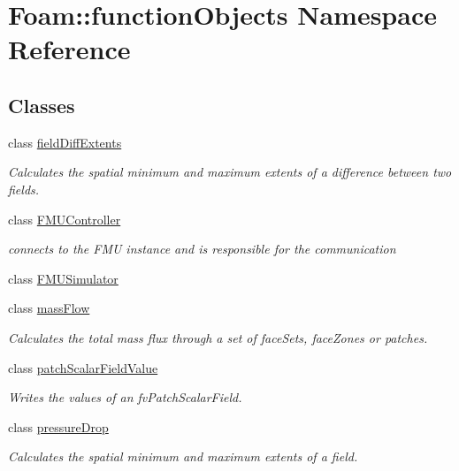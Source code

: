 \hypertarget{namespaceFoam_1_1functionObjects}{}\section{Foam\+:\+:function\+Objects Namespace Reference}
\label{namespaceFoam_1_1functionObjects}
\subsection*{Classes}
\begin{DoxyCompactItemize}
\item 
class \hyperlink{classFoam_1_1functionObjects_1_1fieldDiffExtents}{field\+Diff\+Extents}
\begin{DoxyCompactList}\small\item\em Calculates the spatial minimum and maximum extents of a difference between two fields. \end{DoxyCompactList}\item 
class \hyperlink{classFoam_1_1functionObjects_1_1FMUController}{F\+M\+U\+Controller}
\begin{DoxyCompactList}\small\item\em connects to the F\+MU instance and is responsible for the communication \end{DoxyCompactList}\item 
class \hyperlink{classFoam_1_1functionObjects_1_1FMUSimulator}{F\+M\+U\+Simulator}
\item 
class \hyperlink{classFoam_1_1functionObjects_1_1massFlow}{mass\+Flow}
\begin{DoxyCompactList}\small\item\em Calculates the total mass flux through a set of face\+Sets, face\+Zones or patches. \end{DoxyCompactList}\item 
class \hyperlink{classFoam_1_1functionObjects_1_1patchScalarFieldValue}{patch\+Scalar\+Field\+Value}
\begin{DoxyCompactList}\small\item\em Writes the values of an fv\+Patch\+Scalar\+Field. \end{DoxyCompactList}\item 
class \hyperlink{classFoam_1_1functionObjects_1_1pressureDrop}{pressure\+Drop}
\begin{DoxyCompactList}\small\item\em Calculates the spatial minimum and maximum extents of a field. \end{DoxyCompactList}\item 

\end{DoxyCompactItemize}
